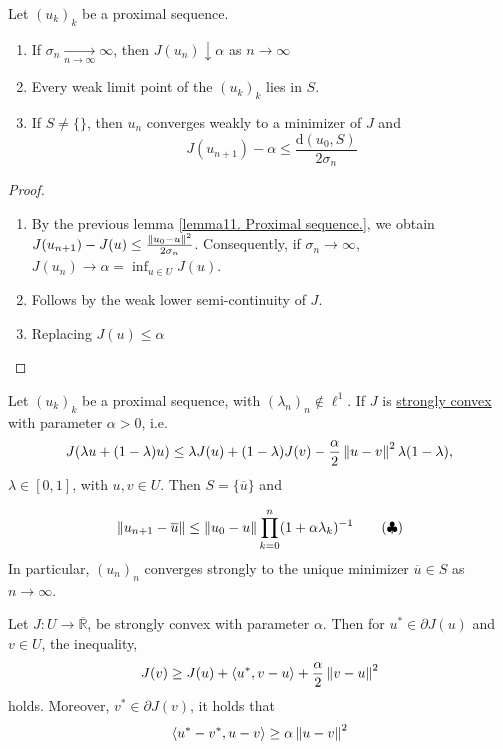 \begin{theorem}
	Let $(u_k)_k$ be a proximal sequence.
	
	\begin{enumerate}
		\item If $\sigma_n \xrightarrow[n\rightarrow\infty]{}\infty$, then $J(u_n) \downarrow \alpha$ as $n\rightarrow \infty$
		\item Every weak limit point of the $(u_k)_k$ lies in $S$.
		\item  If $S\neq\{\}$, then $u_n$ converges weakly to a minimizer of $J$ and 
		\[
			J(u_{n+1}) - \alpha \leq \frac{\mathrm{d}(u_0, S)}{2 \sigma_n}
		\]
	\end{enumerate}
	\begin{proof} \
		\begin{enumerate}

		\item 		By the previous lemma \eqref{lemma11. Proximal sequence.}, we obtain $J(u_{n+1})-J(u) \leq \frac{\left\lVert u_0-u\right\rVert^2}{2\sigma_n}$. Consequently, if $\sigma_n \rightarrow \infty$, $J(u_n)\rightarrow \alpha = \inf_{u\in U } J(u)$.
		\item Follows by the weak lower semi-continuity of $J$.
		\item Replacing $J(u)\leq \alpha$
		\end{enumerate}
	\end{proof}
\end{theorem}

\begin{theorem}
	Let $(u_k)_k$ be a proximal sequence, with $(\lambda_n)_n \notin \ell^1$. If $J$ is \underline{strongly convex} with parameter $\alpha > 0$, i.e. \[J(\lambda u + (1-\lambda)u) \leq \lambda J(u)+ (1-\lambda) J(v) -\frac{\alpha}{2} \left\lVert u-v\right\rVert^2\lambda (1-\lambda),\] $\lambda \in [0,1]$, with $u,v \in U$. Then $S=\{\overline{u}\}$ and 
	
	\begin{equation}
		\label{eq11. Ineq Prod.}\left\lVert u_{n+1}-\overline{u}\right\rVert \leq \left\lVert u_0-u\right\rVert \prod_{k=0}^{n} (1+\alpha \lambda_k)^{-1} \tag{$\clubsuit$}
	\end{equation}
	In particular, $(u_n)_n$ converges strongly to the unique minimizer $\overline{u} \in S$ as $n\rightarrow \infty$.
\end{theorem}

\begin{lemma}
	Let $J:U\rightarrow \overline{\mathbb{R}}$, be strongly convex with parameter $\alpha$. Then for $u^* \in \partial J(u)$ and $v\in U$, the inequality,
	\begin{align*}
		J(v)\geq J(u)+\langle u^*, v-u\rangle +\frac{\alpha}{2}\left\lVert v-u\right\rVert^2
	\end{align*}
	holds. Moreover, $v^* \in \partial J(v)$, it holds that 
	\begin{equation*}
		\langle u^*-v^*, u-v\rangle \geq \alpha \left\lVert u-v\right\rVert^2
	\end{equation*}
\end{lemma}


